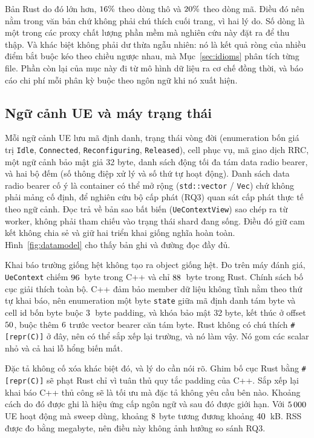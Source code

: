 Bản Rust do đó lớn hơn, $16\%$ theo dòng thô và
$20\%$ theo dòng mã. Điều đó nên nằm trong văn bản chứ không phải chú thích cuối trang, vì hai lý do.
Số dòng là một trong các proxy chất lượng phần mềm mà nghiên cứu này đặt ra để thu thập. Và
khác biệt không phải dư thừa ngẫu nhiên: nó là kết quả ròng của nhiều điểm bắt buộc kéo theo chiều
ngược nhau, mà Mục~\ref{sec:idioms} phân tích từng file. Phần còn lại của mục này
đi từ mô hình dữ liệu ra cơ chế đồng thời, và báo cáo chi phí mỗi
phân kỳ buộc theo ngôn ngữ khi nó xuất hiện.

\subsection{Ngữ cảnh UE và máy trạng thái}\label{sec:uecontext}
Mỗi ngữ cảnh UE lưu mã định danh, trạng thái vòng đời (enumeration bốn giá trị
\texttt{Idle}, \texttt{Connected}, \texttt{Reconfiguring}, \texttt{Released}), cell phục vụ,
mã giao dịch RRC, một ngữ cảnh bảo mật giả 32 byte, danh sách động tối đa tám data
radio bearer, và hai bộ đếm (số thông điệp xử lý và số thứ tự hoạt động). Danh sách data
radio bearer cố ý là container có thể mở rộng (\texttt{std::vector} / \texttt{Vec})
chứ không phải mảng cố định, để nghiên cứu bộ cấp phát (RQ3) quan sát cấp phát
thực tế theo ngữ cảnh. Đọc trả về bản sao bất biến (\texttt{UeContextView}) sao chép ra từ
worker, không phải tham chiếu vào trạng thái shard đang sống. Điều đó giữ cam kết không chia sẻ
và giữ hai triển khai giống nghĩa hoàn toàn.
Hình~\ref{fig:datamodel} cho thấy bản ghi và đường đọc đầy đủ.

Khai báo trường giống hệt không tạo ra object giống hệt. Đo trên
máy đánh giá, \texttt{UeContext} chiếm $96$~byte trong C++ và chỉ
$88$~byte trong Rust.
Chính sách bố cục giải thích toàn bộ. C++ đảm bảo member dữ liệu không tĩnh nằm
theo thứ tự khai báo, nên enumeration một byte \texttt{state} giữa
mã định danh tám byte và cell id bốn byte buộc $3$~byte padding, và
khóa bảo mật 32 byte, kết thúc ở offset $50$, buộc thêm $6$ trước vector bearer căn tám byte. Rust không có chú thích \texttt{\#[repr(C)]} ở đây, nên có thể sắp xếp lại
trường, và nó làm vậy. Nó gom các scalar nhỏ và cả hai lỗ hổng biến mất.

Đặc tả không cố xóa khác biệt đó, và lý do cần nói rõ.
Ghim bố cục Rust bằng \texttt{\#[repr(C)]} sẽ phạt Rust chỉ vì tuân thủ
quy tắc padding của C++. Sắp xếp lại khai báo C++ thủ công sẽ là tối ưu mà
đặc tả không yêu cầu bên nào. Khoảng cách do đó được ghi là hiệu ứng cấp ngôn ngữ và
sau đó được giới hạn. Với $5\,000$ UE hoạt động mà sweep dùng, khoảng $8$ byte
tương đương khoảng $40$~kB. RSS được đo bằng megabyte, nên điều này
không ảnh hưởng so sánh RQ3.

